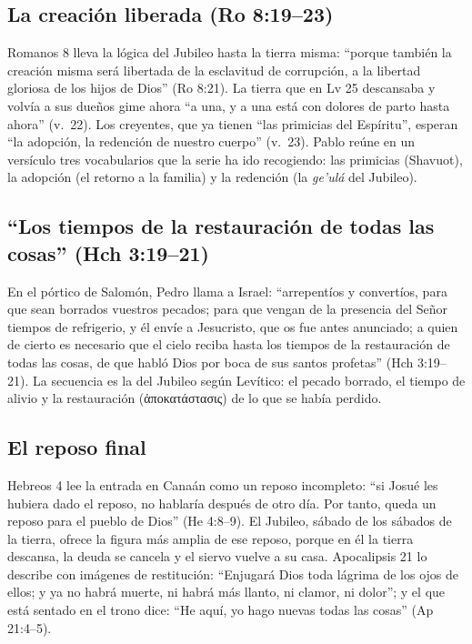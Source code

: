 \documentclass[11pt,letterpaper]{article}
\newcommand{\grc}[1]{\foreignlanguage{ancientgreek}{#1}}
\begin{document}
\subsection{La creación liberada (Ro 8:19--23)}
Romanos 8 lleva la lógica del Jubileo hasta la tierra misma: ``porque también la creación misma será libertada de la esclavitud de corrupción, a la libertad gloriosa de los hijos de Dios'' (Ro 8:21). La tierra que en Lv 25 descansaba y volvía a sus dueños gime ahora ``a una, y a una está con dolores de parto hasta ahora'' (v.~22). Los creyentes, que ya tienen ``las primicias del Espíritu'', esperan ``la adopción, la redención de nuestro cuerpo'' (v.~23). Pablo reúne en un versículo tres vocabularios que la serie ha ido recogiendo: las primicias (Shavuot), la adopción (el retorno a la familia) y la redención (la \emph{ge'ulá} del Jubileo).

\subsection{``Los tiempos de la restauración de todas las cosas'' (Hch 3:19--21)}
En el pórtico de Salomón, Pedro llama a Israel: ``arrepentíos y convertíos, para que sean borrados vuestros pecados; para que vengan de la presencia del Señor tiempos de refrigerio, y él envíe a Jesucristo, que os fue antes anunciado; a quien de cierto es necesario que el cielo reciba hasta los tiempos de la restauración de todas las cosas, de que habló Dios por boca de sus santos profetas'' (Hch 3:19--21). La secuencia es la del Jubileo según Levítico: el pecado borrado, el tiempo de alivio y la restauración (\grc{ἀποκατάστασις}) de lo que se había perdido.

\subsection{El reposo final}
Hebreos 4 lee la entrada en Canaán como un reposo incompleto: ``si Josué les hubiera dado el reposo, no hablaría después de otro día. Por tanto, queda un reposo para el pueblo de Dios'' (He 4:8--9). El Jubileo, sábado de los sábados de la tierra, ofrece la figura más amplia de ese reposo, porque en él la tierra descansa, la deuda se cancela y el siervo vuelve a su casa. Apocalipsis 21 lo describe con imágenes de restitución: ``Enjugará Dios toda lágrima de los ojos de ellos; y ya no habrá muerte, ni habrá más llanto, ni clamor, ni dolor''; y el que está sentado en el trono dice: ``He aquí, yo hago nuevas todas las cosas'' (Ap 21:4--5).
\end{document}
